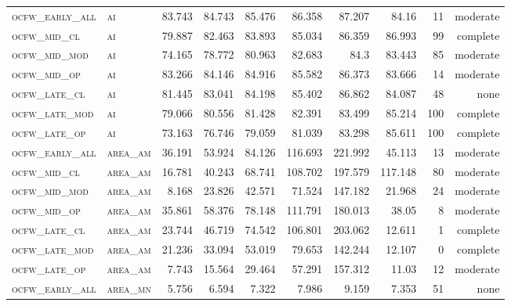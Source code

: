 \begin{landscape}
\begin{center}
\begin{footnotesize}
\begin{longtable}{llrrrrr|rrr}
\textsc{ocfw\_early\_all} & \textsc{ai        }    & 83.743   & 84.743   & 85.476   & 86.358   & 87.207   & 84.16    & 11  & moderate \\
\textsc{ocfw\_mid\_cl   } & \textsc{ai        }    & 79.887   & 82.463   & 83.893   & 85.034   & 86.359   & 86.993   & 99  & complete \\
\textsc{ocfw\_mid\_mod  } & \textsc{ai        }    & 74.165   & 78.772   & 80.963   & 82.683   & 84.3     & 83.443   & 85  & moderate \\
\textsc{ocfw\_mid\_op   } & \textsc{ai        }    & 83.266   & 84.146   & 84.916   & 85.582   & 86.373   & 83.666   & 14  & moderate \\
\textsc{ocfw\_late\_cl  } & \textsc{ai        }    & 81.445   & 83.041   & 84.198   & 85.402   & 86.862   & 84.087   & 48  & none     \\
\textsc{ocfw\_late\_mod } & \textsc{ai        }    & 79.066   & 80.556   & 81.428   & 82.391   & 83.499   & 85.214   & 100 & complete \\
\textsc{ocfw\_late\_op  } & \textsc{ai        }    & 73.163   & 76.746   & 79.059   & 81.039   & 83.298   & 85.611   & 100 & complete \\
\textsc{ocfw\_early\_all} & \textsc{area\_am  }    & 36.191   & 53.924   & 84.126   & 116.693  & 221.992  & 45.113   & 13  & moderate \\
\textsc{ocfw\_mid\_cl   } & \textsc{area\_am  }    & 16.781   & 40.243   & 68.741   & 108.702  & 197.579  & 117.148  & 80  & moderate \\
\textsc{ocfw\_mid\_mod  } & \textsc{area\_am  }    & 8.168    & 23.826   & 42.571   & 71.524   & 147.182  & 21.968   & 24  & moderate \\
\textsc{ocfw\_mid\_op   } & \textsc{area\_am  }    & 35.861   & 58.376   & 78.148   & 111.791  & 180.013  & 38.05    & 8   & moderate \\
\textsc{ocfw\_late\_cl  } & \textsc{area\_am  }    & 23.744   & 46.719   & 74.542   & 106.801  & 203.062  & 12.611   & 1   & complete \\
\textsc{ocfw\_late\_mod } & \textsc{area\_am  }    & 21.236   & 33.094   & 53.019   & 79.653   & 142.244  & 12.107   & 0   & complete \\
\textsc{ocfw\_late\_op  } & \textsc{area\_am  }    & 7.743    & 15.564   & 29.464   & 57.291   & 157.312  & 11.03    & 12  & moderate \\
\textsc{ocfw\_early\_all} & \textsc{area\_mn  }    & 5.756    & 6.594    & 7.322    & 7.986    & 9.159    & 7.353    & 51  & none     \\

\end{longtable}
\end{footnotesize}
\end{center}
\end{landscape}
